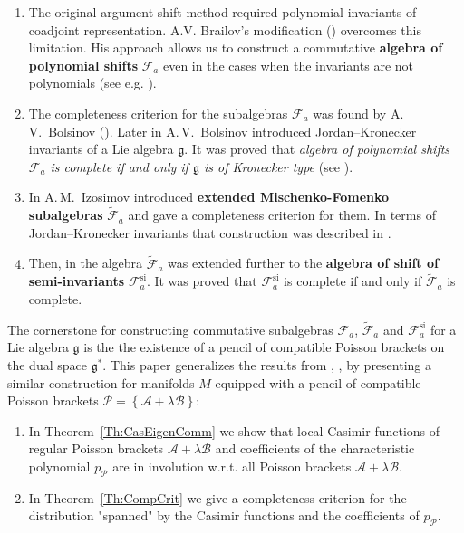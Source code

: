 \documentclass[12pt]{article}
\theoremstyle{definition}
\begin{document}
\begin{enumerate}

\item The original argument shift method required polynomial invariants of coadjoint representation. A.V. Brailov's modification (\cite{Bolsinov14}) overcomes this limitation. His approach allows us to construct a commutative \textbf{algebra of polynomial shifts}
$\mathcal{F}_a$ even in the cases when the invariants are not polynomials (see e.g. \cite[Theorem 1]{BolsZhang}).

\item The completeness criterion for the subalgebras $\mathcal{F}_a$  was found by A.\,V.~Bolsinov (\cite{Bolsinov92}).  Later in  \cite{BolsZhang}  A.\,V.~Bolsinov introduced Jordan--Kronecker invariants of a Lie algebra $\mathfrak{g}$. It was proved that \textit{algebra of polynomial shifts $\mathcal{F}_a$ is complete if and only if $\mathfrak{g}$ is of Kronecker type} (see  \cite[Theorem 3]{BolsZhang}). 

\item In \cite{Izosimov14} A.\,M.~Izosimov introduced \textbf{extended Mischenko-Fomenko subalgebras} $\tilde{\mathcal{F}}_a$ and gave a completeness criterion for them. In terms of Jordan--Kronecker invariants that construction was described in   \cite[Section 7]{BolsZhang}. 

\item Then, in  \cite{Kozlov23Shift} the algebra $\tilde{\mathcal{F}}_a$ was extended further to the  \textbf{algebra of shift of semi-invariants} $\mathcal{F}_{a}^{\textrm{si}}$. It was proved that $\mathcal{F}_{a}^{\textrm{si}}$ is complete if and only if $\tilde{\mathcal{F}}_a$ is complete. 

\end{enumerate}

The cornerstone for constructing commutative subalgebras  $\mathcal{F}_a$, $\tilde{\mathcal{F}}_a$ and $\mathcal{F}_{a}^{\textrm{si}}$ for a Lie algebra $\mathfrak{g}$ is the the existence of a pencil of compatible Poisson brackets on the dual space  $\mathfrak{g}^*$. This paper generalizes the results from \cite{BolsZhang}, \cite{Izosimov14}, \cite{Kozlov23Shift} by presenting a similar construction for manifolds $M$ equipped with a pencil of compatible Poisson brackets $\mathcal{P} = \left\{\mathcal{A} + \lambda\mathcal{B} \right\} $:

\begin{enumerate}

\item In Theorem~\ref{Th:CasEigenComm} we show that local Casimir functions of regular Poisson brackets $\mathcal{A} + \lambda \mathcal{B}$  and coefficients of the characteristic polynomial $p_{\mathcal{P}}$ are in involution w.r.t. all Poisson brackets $\mathcal{A} + \lambda \mathcal{B}$.

\item In Theorem~\ref{Th:CompCrit} we give a completeness criterion for the distribution "spanned" by the Casimir functions and the coefficients of $p_{\mathcal{P}}$. 

\end{enumerate}
\end{document}
